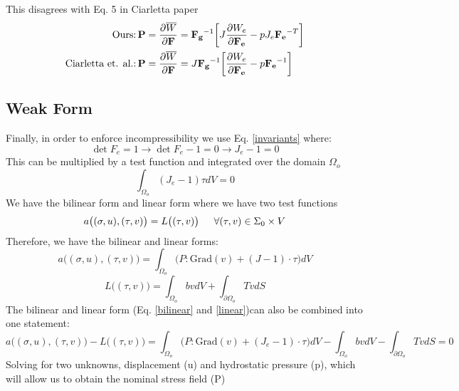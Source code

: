 \documentclass[12pt,3p]{article}
\numberwithin{equation}{section}
\begin{document}
This disagrees with Eq. 5 in Ciarletta paper 
\begin{align*}
\text{Ours:}\, 
\mathbf{P} = \pdv{\overline{W}}{\mathbf{F}} &= \mathbf{F_g}^{-1} \bigg[  J \pdv{W_e}{\mathbf{F_e}} - p J_e \mathbf{F_e}^{-T} \bigg]\\
\text{Ciarletta et. al.:} \, 
\mathbf{P} = \pdv{\overline{W}}{\mathbf{F}} &= J \mathbf{F_g}^{-1} \bigg[ \pdv{W_e}{\mathbf{F_e}} - p \mathbf{F_e}^{-1} \bigg] 
\end{align*}

\subsection{Weak Form}
Finally, in order to enforce incompressibility we use Eq. \ref{invariants} where:
\begin{equation*}
\det F_e = 1 \rightarrow \det F_e - 1 = 0 \rightarrow J_e - 1 = 0
\end{equation*}
This can be multiplied by a test function and integrated over the domain $\Omega_o$
\begin{equation}\label{wFormIn}
\int_{\Omega_o} (J_e - 1) \tau dV = 0
\end{equation}
We have the bilinear form and linear form where we have two test functions
\begin{equation*}
a\big((\sigma,u),(\tau, v) \big) = L\big((\tau, v) \big)  \indent \forall (\tau, v) \in \Sigma_0 \times V 
\end{equation*}
Therefore, we have the bilinear and linear forms: 
\begin{equation}\label{bilinear}
a\big((\sigma,u),(\tau, v) \big) = \int_{\Omega_o} \big( P : \text{Grad}(v) + (J-1) \cdot \tau \big) dV
\end{equation}
\begin{equation}\label{linear}
L\big((\tau, v) \big) = \int_{\Omega_o} b v dV + \int_{\partial \Omega_o} T v dS
\end{equation}
The bilinear and linear form (Eq. \ref{bilinear} and \ref{linear})can also be combined into one statement: 
\begin{equation}\label{F}
a\big((\sigma,u),(\tau, v) \big) - L\big((\tau, v) \big) = \int_{\Omega_o} \big( P : \text{Grad}(v) + (J_e-1) \cdot \tau \big) dV - \int_{\Omega_o} b v dV - \int_{\partial \Omega_o} T v dS = 0 
\end{equation}
Solving for two unknowns, displacement (u) and hydrostatic pressure (p), which will allow us to obtain the nominal stress field (P)
\newpage 
\end{document}
